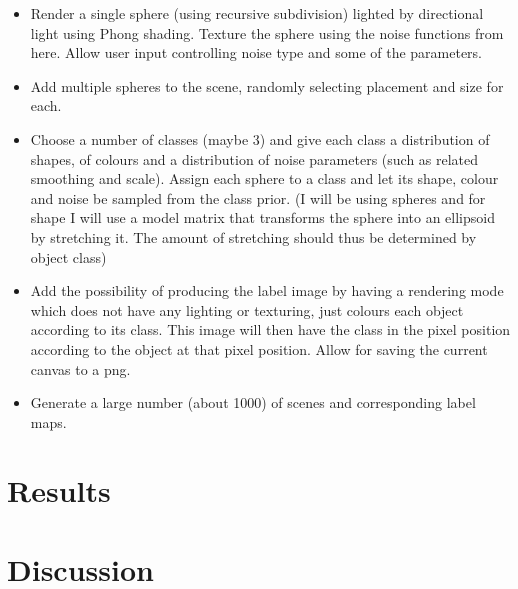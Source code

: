 \documentclass[12pt,fleqn]{article}
\begin{document}
\begin{itemize}
    \item Render a single sphere (using recursive subdivision) lighted by directional light using Phong shading. Texture the sphere using the noise functions from here. Allow user input controlling noise type and some of the parameters.
    \item Add multiple spheres to the scene, randomly selecting placement and size for each.
    \item Choose a number of classes (maybe 3) and give each class a distribution of shapes, of colours and a distribution of noise parameters (such as related smoothing and scale). Assign each sphere to a class and let its shape, colour and noise be sampled from the class prior. (I will be using spheres and for shape I will use a model matrix that transforms the sphere into an ellipsoid by stretching it. The amount of stretching should thus be determined by object class)
    \item Add the possibility of producing the label image by having a rendering mode which does not have any lighting or texturing, just colours each object according to its class. This image will then have the class in the pixel position according to the object at that pixel position. Allow for saving the current canvas to a png.
    \item Generate a large number (about 1000) of scenes and corresponding label maps.
\end{itemize}

\section{Results}%
\label{sec:results}

\section{Discussion}%
\label{sec:disc}
\end{document}
